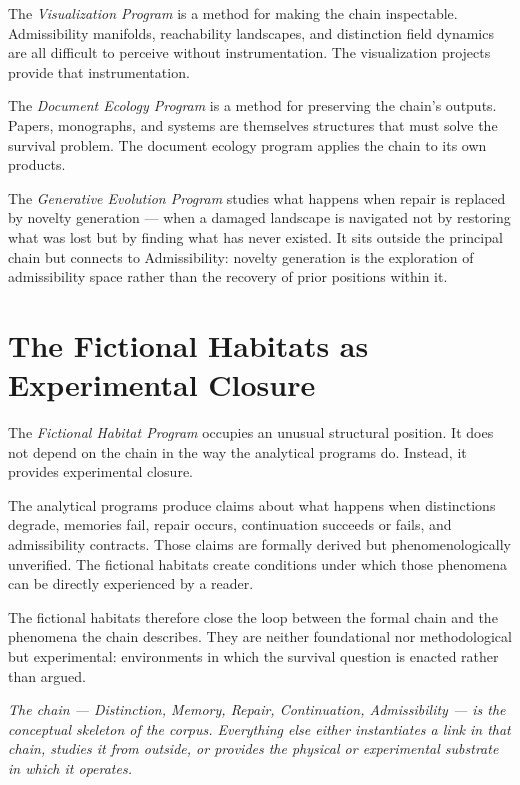 \documentclass[12pt, openany]{book}
\begin{document}
The \textit{Visualization Program} is a method for making the chain
inspectable. Admissibility manifolds, reachability landscapes, and
distinction field dynamics are all difficult to perceive without
instrumentation. The visualization projects provide that instrumentation.

The \textit{Document Ecology Program} is a method for preserving the
chain's outputs. Papers, monographs, and systems are themselves structures
that must solve the survival problem. The document ecology program applies
the chain to its own products.

The \textit{Generative Evolution Program} studies what happens when repair
is replaced by novelty generation — when a damaged landscape is navigated
not by restoring what was lost but by finding what has never existed. It
sits outside the principal chain but connects to Admissibility: novelty
generation is the exploration of admissibility space rather than the
recovery of prior positions within it.

\section{The Fictional Habitats as Experimental Closure}

The \textit{Fictional Habitat Program} occupies an unusual structural
position. It does not depend on the chain in the way the analytical
programs do. Instead, it provides experimental closure.

The analytical programs produce claims about what happens when distinctions
degrade, memories fail, repair occurs, continuation succeeds or fails, and
admissibility contracts. Those claims are formally derived but
phenomenologically unverified. The fictional habitats create conditions
under which those phenomena can be directly experienced by a reader.

The fictional habitats therefore close the loop between the formal chain
and the phenomena the chain describes. They are neither foundational nor
methodological but experimental: environments in which the survival
question is enacted rather than argued.

\bigskip

\noindent\textit{The chain — Distinction, Memory, Repair, Continuation,
Admissibility — is the conceptual skeleton of the corpus. Everything else
either instantiates a link in that chain, studies it from outside, or
provides the physical or experimental substrate in which it operates.}
\end{document}
